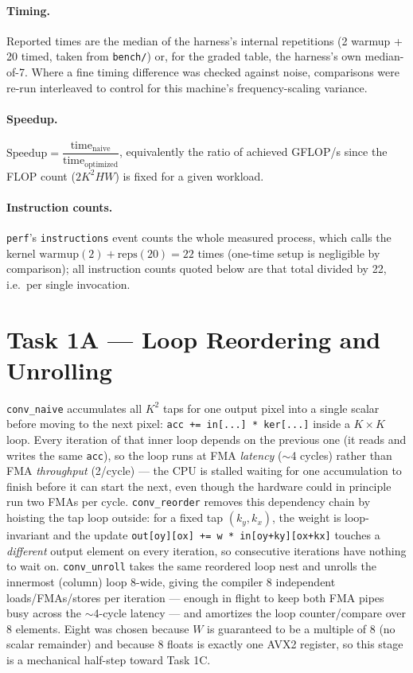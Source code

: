 \documentclass[11pt]{article}
\begin{document}
\paragraph{Timing.} Reported times are the median of the harness's internal repetitions
(2 warmup + 20 timed, taken from \texttt{bench/}) or, for the graded table, the harness's
own median-of-7. Where a fine timing difference was checked against noise, comparisons
were re-run interleaved to control for this machine's frequency-scaling variance.

\paragraph{Speedup.} $\text{Speedup} = \dfrac{\text{time}_{\text{naive}}}{\text{time}_{\text{optimized}}}$,
equivalently the ratio of achieved GFLOP/s since the FLOP count ($2K^2HW$) is fixed for
a given workload.

\paragraph{Instruction counts.} \texttt{perf}'s \texttt{instructions} event counts the
whole measured process, which calls the kernel $\text{warmup}(2)+\text{reps}(20)=22$
times (one-time setup is negligible by comparison); all instruction counts quoted below
are that total divided by 22, i.e.\ per single invocation.

\section{Task 1A --- Loop Reordering and Unrolling}

\texttt{conv\_naive} accumulates all $K^2$ taps for one output pixel into a single
scalar before moving to the next pixel: \texttt{acc += in[...] * ker[...]} inside a
$K{\times}K$ loop. Every iteration of that inner loop depends on the previous one (it
reads and writes the same \texttt{acc}), so the loop runs at FMA \emph{latency}
($\sim$4 cycles) rather than FMA \emph{throughput} (2/cycle) --- the CPU is stalled
waiting for one accumulation to finish before it can start the next, even though the
hardware could in principle run two FMAs per cycle. \texttt{conv\_reorder} removes this
dependency chain by hoisting the tap loop outside: for a fixed tap $(k_y,k_x)$, the
weight is loop-invariant and the update \texttt{out[oy][ox] += w * in[oy+ky][ox+kx]}
touches a \emph{different} output element on every iteration, so consecutive iterations
have nothing to wait on. \texttt{conv\_unroll} takes the same reordered loop nest and
unrolls the innermost (column) loop 8-wide, giving the compiler 8 independent
loads/FMAs/stores per iteration --- enough in flight to keep both FMA pipes busy across
the $\sim$4-cycle latency --- and amortizes the loop counter/compare over 8 elements.
Eight was chosen because $W$ is guaranteed to be a multiple of 8 (no scalar remainder)
and because 8 floats is exactly one AVX2 register, so this stage is a mechanical
half-step toward Task 1C.
\end{document}
